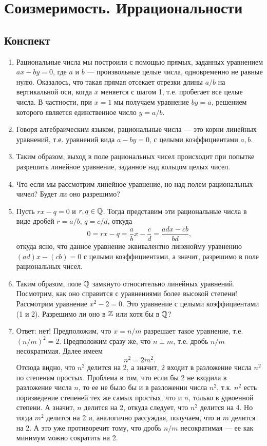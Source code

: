 \section{Соизмеримость. Иррациональности}

\subsection*{Конспект}

\begin{enumerate}
\item Рациональные числа мы построили с помощью прямых, заданных уравнением $ax-by=0$, где $a$ и $b$ --- произвольные целые числа, одновременно не равные нулю. Оказалось, что такая прямая отсекает отрезки длины $a/b$ на вертикальной оси, когда $x$ меняется с шагом 1, т.е. пробегает все целые числа. В частности, при $x=1$ мы получаем уравнение $by=a$, решением которого является единственное число $y=a/b$.
\item Говоря алгебраическим языком, рациональные числа --- это корни линейных уравнений, т.е. уравнений вида $a-by=0$, с целыми коэффициентами $a,b$.
\item Таким образом, выход в поле рациональных чисел происходит при попытке разрешить линейное уравнение, заданное над кольцом целых чисел.
\item Что если мы рассмотрим линейное уравнение, но над полем рациональных чичел? Будет ли оно разрешимо?
\item Пусть $rx-q=0$ и $r,q\in\mathbb Q$. Тогда представим эти рациональные числа в виде дробей $r=a/b$, $q=c/d$, откуда
$$
0=rx-q = \frac{a}{b}x-\frac{c}{d} = \frac{adx-cb}{bd},
$$
откуда ясно, что данное уравнение эквивалентно линенойму уравнению $(ad)x-(cb)=0$ с целыми коэффициентами, а значит, разрешимо в поле рациональных чисел.
\item Таким образом, поле $\mathbb Q$ замкнуто относительно линейных уравнений. Посмотрим, как оно справится с уравнениями более высокой степени! Рассмотрим уравнение $x^2-2=0$. Это уравнение с целыми коэффициентами (1 и 2). Разрешимо ли оно в $\mathbb Z$ или хотя бы в $\mathbb Q$?
\item Ответ: нет! Предположим, что $x=n/m$ разрешает такое уравнение, т.е. $(n/m)^2=2$. Предположим сразу же, что $n\perp m$, т.е. дробь $n/m$ несократимая. Далее имеем
$$
n^2=2m^2.
$$
Отсюда видно, что $n^2$ делится на 2, а значит, $2$ входит в разложение числа $n^2$ по степеням простых. Проблема в том, что если бы 2 не входила в разложение числа $n$, то ее не было бы и в разложении числа $n^2$, т.к. $n^2$ есть поризведение степеней тех же самых простых, что и $n$, только в удвоенной степени. А значит, $n$ делится на 2, откуда следует, что $n^2$ делится на 4. Но тогда $m^2$ делится на 2 и, аналогично рассуждая, получаем, что и $m$ делится на 2. А это уже противоречит тому, что дробь $n/m$ несократимая --- ее как минимум можно сократить на 2.


\end{enumerate}
